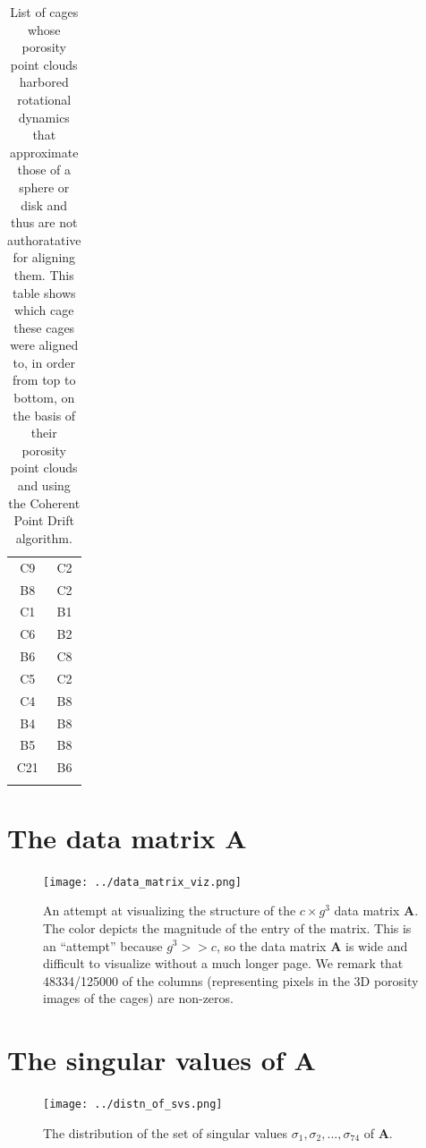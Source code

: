 \documentclass[journal=jacsat,manuscript=article]{achemso}
\begin{document}
\begin{longtable}{cc}
 C9 & C2\\
 B8 & C2\\
 C1 & B1\\
 C6 & B2\\
 B6 & C8\\
 C5 & C2\\
 C4 & B8\\
 B4 & B8\\
 B5 & B8\\
 C21 & B6\\
    \hline
          \caption{List of cages whose porosity point clouds harbored rotational dynamics that approximate those of a sphere or disk and thus are not authoratative for aligning them. This table shows which cage these cages were aligned to, in order from top to bottom, on the basis of their porosity point clouds and using the Coherent Point Drift algorithm.}
  \label{tbl:aligned_via_coherent_point_drift}
\end{longtable}

\clearpage
\newpage

\section{The data matrix $\mathbf{A}$}

\begin{figure}
\centering
	\texttt{[image: ../data\_matrix\_viz.png]}
	\caption{An attempt at visualizing the structure of the $c \times g^3$ data matrix $\mathbf{A}$. The color depicts the magnitude of the entry of the matrix. This is an ``attempt'' because $g^3>>c$, so the data matrix $\mathbf{A}$ is wide and difficult to visualize without a much longer page. We remark that 48334/125000 of the columns (representing pixels in the 3D porosity images of the cages) are non-zeros.
	} \label{fig:data_matrix}
\end{figure}

\newpage
\clearpage

\section{The singular values of $\mathbf{A}$}

\begin{figure}
\centering
	\texttt{[image: ../distn\_of\_svs.png]}
	\caption{The distribution of the set of singular values $\sigma_1,\sigma_2, ..., \sigma_{74}$ of $\mathbf{A}$.
	} \label{fig:distn_of_svs}
\end{figure}
\end{document}
